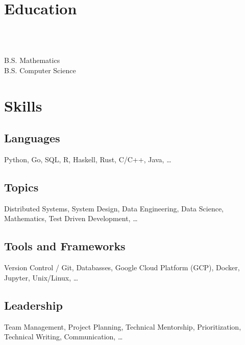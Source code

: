 \documentclass{tc_cv}
\begin{document}

\begin{minipage}[t]{0.3\linewidth}

  \vspace{2em}
  \section{Education}
  \\
  \date{Fall 2011 --- Spring 2016}\vspace{0.25em}\\
  \faGraduationCap \hspace{1ex} B.S. Mathematics\\
  \faGraduationCap \hspace{1ex} B.S. Computer Science

  \vspace{2em}
  \section{Skills}
  \subsection{Languages}
  Python,
  Go,
  SQL,
  R,
  Haskell,
  Rust,
  C/C++,
  Java,
  \ldots

  \subsection{Topics}
  Distributed Systems,
  System Design,
  Data Engineering,
  Data Science,
  Mathematics,
  Test Driven Development,
  \ldots

  \subsection{Tools and Frameworks}
  Version Control / Git,
  Databasses,
  Google Cloud Platform (GCP),
  Docker,
  Jupyter,
  Unix/Linux,
  \ldots

  \subsection{Leadership}
  Team Management,
  Project Planning,
  Technical Mentorship,
  Prioritization,
  Technical Writing,
  Communication,
  \ldots


\end{minipage}
\end{document}
